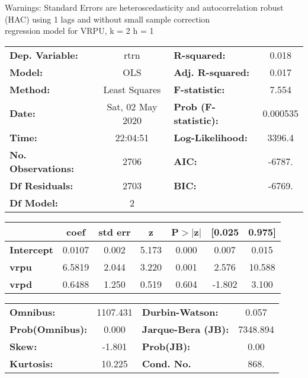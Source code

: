 Warnings: \newline
 [1] Standard Errors are heteroscedasticity and autocorrelation robust (HAC) using 1 lags and without small sample correction\\ 

regression model for VRPU, k = 2 h = 1\begin{center}
\begin{tabular}{lclc}
\toprule
\textbf{Dep. Variable:}    &       rtrn       & \textbf{  R-squared:         } &     0.018   \\
\textbf{Model:}            &       OLS        & \textbf{  Adj. R-squared:    } &     0.017   \\
\textbf{Method:}           &  Least Squares   & \textbf{  F-statistic:       } &     7.554   \\
\textbf{Date:}             & Sat, 02 May 2020 & \textbf{  Prob (F-statistic):} &  0.000535   \\
\textbf{Time:}             &     22:04:51     & \textbf{  Log-Likelihood:    } &    3396.4   \\
\textbf{No. Observations:} &        2706      & \textbf{  AIC:               } &    -6787.   \\
\textbf{Df Residuals:}     &        2703      & \textbf{  BIC:               } &    -6769.   \\
\textbf{Df Model:}         &           2      & \textbf{                     } &             \\
\bottomrule
\end{tabular}
\begin{tabular}{lcccccc}
                   & \textbf{coef} & \textbf{std err} & \textbf{z} & \textbf{P$> |$z$|$} & \textbf{[0.025} & \textbf{0.975]}  \\
\midrule
\textbf{Intercept} &       0.0107  &        0.002     &     5.173  &         0.000        &        0.007    &        0.015     \\
\textbf{vrpu}      &       6.5819  &        2.044     &     3.220  &         0.001        &        2.576    &       10.588     \\
\textbf{vrpd}      &       0.6488  &        1.250     &     0.519  &         0.604        &       -1.802    &        3.100     \\
\bottomrule
\end{tabular}
\begin{tabular}{lclc}
\textbf{Omnibus:}       & 1107.431 & \textbf{  Durbin-Watson:     } &    0.057  \\
\textbf{Prob(Omnibus):} &   0.000  & \textbf{  Jarque-Bera (JB):  } & 7348.894  \\
\textbf{Skew:}          &  -1.801  & \textbf{  Prob(JB):          } &     0.00  \\
\textbf{Kurtosis:}      &  10.225  & \textbf{  Cond. No.          } &     868.  \\
\bottomrule
\end{tabular}
\end{center}

